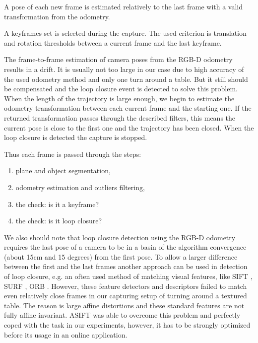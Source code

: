 \documentclass[letterpaper, 10 pt, conference]{ieeeconf}  %
\begin{document}
A pose of each new frame is estimated relatively to the last frame
with a valid transformation from the odometry.

A keyframes set is selected during the capture.
The used criterion is translation and rotation thresholds 
between a current frame and the last keyframe.

The frame-to-frame estimation of camera poses from the RGB-D 
odometry results in a drift. It is usually not too large in our case
due to high accuracy of the used odometry method \cite{steinbrucker2011real}
and only one turn around a table.
But it still should be compensated and the loop closure event is detected to solve this problem.
When the length of the trajectory is large enough, we begin to estimate the
odometry transformation between each current frame and the starting one. 
If the returned transformation passes through the described filters, 
this means the current pose is close to the first one and 
the trajectory has been closed. When the loop closure is detected 
the capture is stopped.

Thus each frame is passed through the steps:

\begin{enumerate}
 \item plane and object segmentation,
 \item odometry estimation and outliers filtering,
 \item the check: is it a keyframe?
 \item the check: is it loop closure?
\end{enumerate}

We also should note that loop closure detection using the RGB-D odometry requires
the last pose of a camera to be in a basin of
the algorithm convergence (about 15cm and 15 degrees) from the first pose. 
To allow a larger difference between the first and the last frames
another approach can be used in detection of loop closure, e.g.
an often used method of matching visual features, like
SIFT \cite{lowe2004distinctive}, SURF \cite{bay2006surf}, ORB \cite{rublee2011orb}.
However, these feature detectors and descriptors failed to match even
relatively close frames in our capturing setup of turning around a textured table.
The reason is large affine distortions
and these standard features are not fully affine invariant.
ASIFT \cite{morel2009asift} was able to overcome this problem
and perfectly coped with the task in our experiments,
however, it has to be strongly optimized before its usage in an online application.
\end{document}
